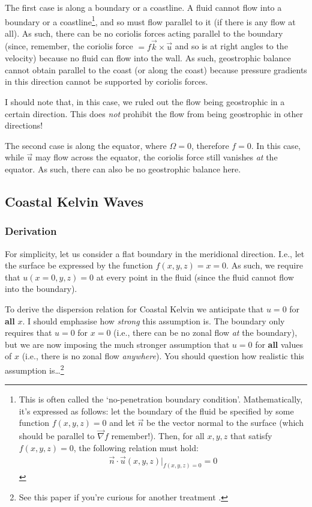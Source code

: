 The first case is along a boundary or a coastline. A fluid cannot flow into a boundary or a coastline\footnote{
    This is often called the `no-penetration boundary condition'. Mathematically, it's expressed as follows: let the boundary of the fluid be specified by some function \(f(x,y,z)=0\) and let \(\vec{n}\) be the vector normal to the surface (which should be parallel to \(\vec{\nabla}f\) remember!). Then, for all \(x,y,z\) that satisfy \(f(x,y,z)=0\), the following relation must hold:
    \begin{align*}
        \vec{n}\cdot\vec{u}(x,y,z)|_{f(x,y,z)=0}=0
    \end{align*}
}, and so must flow parallel to it (if there is any flow at all). As such, there can be no coriolis forces acting parallel to the boundary (since, remember, the coriolis force \(=f\vec{k}\times\vec{u}\) and so is at right angles to the velocity) because no fluid can flow into the wall. As such, geostrophic balance cannot obtain parallel to the coast (or along the coast) because pressure gradients in this direction cannot be supported by coriolis forces.

I should note that, in this case, we ruled out the flow being geostrophic in a certain direction. This does \textit{not} prohibit the flow from being geostrophic in other directions!

The second case is along the equator, where \(\Omega=0\), therefore \(f= 0\). In this case, while \(\vec{u}\) may flow across the equator, the coriolis force still vanishes \textit{at} the equator. As such, there can also be no geostrophic balance here.

\subsection{Coastal Kelvin Waves}

\subsubsection{Derivation}

For simplicity, let us consider a flat boundary in the meridional direction. I.e., let the surface be expressed by the function \(f(x,y,z)=x=0\). As such, we require that \(u(x=0,y,z)=0\) at every point in the fluid (since the fluid cannot flow into the boundary).

To derive the dispersion relation for Coastal Kelvin we anticipate that \(u=0\) for \textbf{all} \(x\). I should emphasise how \textit{strong} this assumption is. The boundary only requires that \(u=0\) for \(x=0\) (i.e., there can be no zonal flow \textit{at} the boundary), but we are now imposing the much stronger assumption that \(u=0\) for \textbf{all} values of \(x\) (i.e., there is no zonal flow \textit{anywhere}). You should question how realistic this assumption is\dots\footnote{See this paper if you're curious for another treatment \cite{M&H13}.}

